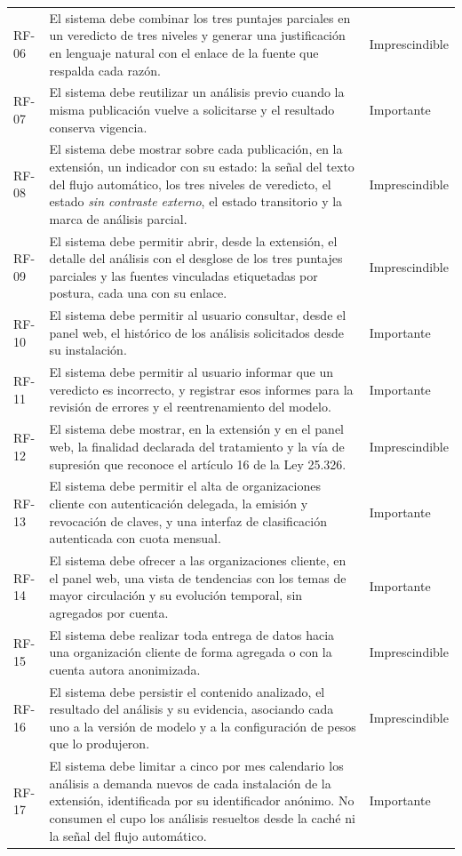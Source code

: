 \begin{small}
\begin{longtable}{@{}p{1.3cm} p{10.2cm} p{2.4cm}@{}}
  RF-06 & El sistema debe combinar los tres puntajes parciales en un veredicto de tres niveles y generar una justificación en lenguaje natural con el enlace de la fuente que respalda cada razón. & Imprescindible \\
  RF-07 & El sistema debe reutilizar un análisis previo cuando la misma publicación vuelve a solicitarse y el resultado conserva vigencia. & Importante \\
  RF-08 & El sistema debe mostrar sobre cada publicación, en la extensión, un indicador con su estado: la señal del texto del flujo automático, los tres niveles de veredicto, el estado \emph{sin contraste externo}, el estado transitorio y la marca de análisis parcial. & Imprescindible \\
  RF-09 & El sistema debe permitir abrir, desde la extensión, el detalle del análisis con el desglose de los tres puntajes parciales y las fuentes vinculadas etiquetadas por postura, cada una con su enlace. & Imprescindible \\
  RF-10 & El sistema debe permitir al usuario consultar, desde el panel web, el histórico de los análisis solicitados desde su instalación. & Importante \\
  RF-11 & El sistema debe permitir al usuario informar que un veredicto es incorrecto, y registrar esos informes para la revisión de errores y el reentrenamiento del modelo. & Importante \\
  RF-12 & El sistema debe mostrar, en la extensión y en el panel web, la finalidad declarada del tratamiento y la vía de supresión que reconoce el artículo 16 de la Ley 25.326. & Imprescindible \\
  RF-13 & El sistema debe permitir el alta de organizaciones cliente con autenticación delegada, la emisión y revocación de claves, y una interfaz de clasificación autenticada con cuota mensual. & Importante \\
  RF-14 & El sistema debe ofrecer a las organizaciones cliente, en el panel web, una vista de tendencias con los temas de mayor circulación y su evolución temporal, sin agregados por cuenta. & Importante \\
  RF-15 & El sistema debe realizar toda entrega de datos hacia una organización cliente de forma agregada o con la cuenta autora anonimizada. & Imprescindible \\
  RF-16 & El sistema debe persistir el contenido analizado, el resultado del análisis y su evidencia, asociando cada uno a la versión de modelo y a la configuración de pesos que lo produjeron. & Imprescindible \\
  RF-17 & El sistema debe limitar a cinco por mes calendario los análisis a demanda nuevos de cada instalación de la extensión, identificada por su identificador anónimo. No consumen el cupo los análisis resueltos desde la caché ni la señal del flujo automático. & Importante \\
\end{longtable}
\end{small}

